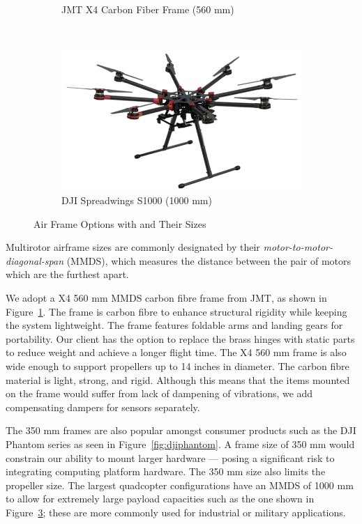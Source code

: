 \begin{figure}[h]
\begin{subfigure}[b]{0.33\textwidth}
		\caption{JMT X4 Carbon Fiber Frame (560 mm)}
		\label{fig:jmtx4}
	\end{subfigure}
	~
	\begin{subfigure}[b]{0.33\textwidth}
		\centering
		\includegraphics[width=\textwidth]{img/djis1000}
		\caption{DJI Spreadwings S1000 (1000 mm)}
		\label{fig:djis1000}
	\end{subfigure}
	
	\caption{Air Frame Options with and Their Sizes }
\end{figure}

Multirotor airframe sizes are commonly designated by their \textit{motor-to-motor-diagonal-span} (MMDS), which measures the distance between the pair of motors which are the furthest apart. 

We adopt a X4 560 mm MMDS carbon fibre frame from JMT, as shown in Figure~\ref{fig:jmtx4}. The frame is carbon fibre to enhance structural rigidity while keeping the system lightweight. The frame features foldable arms and landing gears for portability. Our client has the option to replace the brass hinges with static parts to reduce  weight and achieve a longer flight time. The X4 560 mm frame is also wide enough to support propellers up to 14 inches in diameter. The carbon fibre material is light, strong, and rigid. Although this means that the items mounted on the frame would suffer from lack of dampening of vibrations, we add compensating dampers for sensors separately.

The 350 mm frames are also popular amongst consumer products such as the DJI Phantom series\cite{dji-phantom-3-specs} as seen in Figure~\ref{fig:djiphantom}. A frame size of 350 mm would constrain our ability to mount larger hardware --- posing a significant risk to integrating computing platform hardware. The 350 mm size also limits the propeller size. The largest quadcopter configurations have an MMDS of 1000 mm to allow for extremely large payload capacities such as the one shown in Figure~\ref{fig:djis1000}; these are more commonly used for industrial or military applications.

